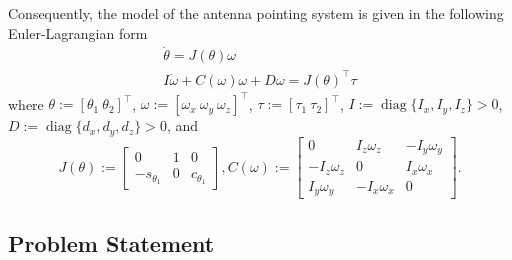 \documentclass{ifacconf}
\begin{document}
Consequently, the model of the antenna pointing system is given in the following Euler-Lagrangian form \vspace{-0.3cm}
\begin{subequations}
  \label{eq:EL}
  \begin{eqnarray}
     \label{eq:EL-a} & \dot{\theta} =J(\theta)\omega &\\
     \label{eq:EL-b} & I\dot{\omega}+C(\omega)\omega + D\omega=J(\theta)^\top\tau  & 
  \end{eqnarray}
\end{subequations}
where $\theta:=[\theta_1~\theta_2]^\top$, $\omega:=[\omega_x~\omega_y~\omega_z]^\top$, $\tau:=[\tau_1~\tau_2]^\top$, $I:=\operatorname{diag}\{I_x,I_y,I_z\}>0$, $D:=\operatorname{diag}\{d_x,d_y,d_z\}>0$, and
\begin{equation*}
    J(\theta):=\begin{bmatrix}
        0 & 1 & 0 \\
        -s_{\theta_1} & 0 & c_{\theta_1}
    \end{bmatrix}, 
    C(\omega):=\begin{bmatrix}
        0 & I_z\omega_z & -I_y\omega_y \\
        -I_z\omega_z & 0  & I_x\omega_x \\
        I_y\omega_y & -I_x\omega_x & 0
    \end{bmatrix}.
\end{equation*}

\subsection{Problem Statement}
\end{document}
